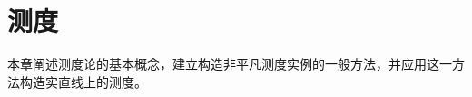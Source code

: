 \documentclass[../main.tex]{subfiles} %
\begin{document}
\chapter{测度}\label{chapter:ch01-measures}
本章阐述测度论的基本概念，建立构造非平凡测度实例的一般方法，并应用这一方法构造实直线上的测度。






\end{document}
